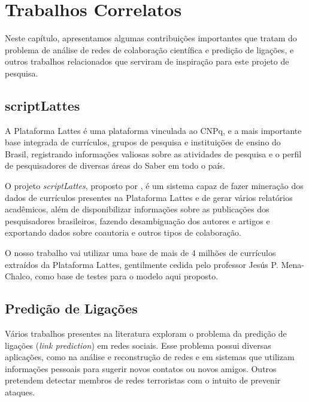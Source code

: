 \chapter{Trabalhos Correlatos}
\label{cap:correlatos}

Neste capítulo, apresentamos algumas contribuições importantes que tratam do problema de análise de redes de colaboração científica e predição de ligações, e outros trabalhos relacionados que serviram de inspiração para este projeto de pesquisa.


\section{scriptLattes}
\label{sec:scriptLattes}

A Plataforma Lattes é uma plataforma vinculada ao CNPq, e a mais importante base integrada de currículos, grupos de pesquisa e instituições de ensino do Brasil, registrando informações valiosas sobre as atividades de pesquisa e o perfil de pesquisadores de diversas áreas do Saber em todo o país.

O projeto \textit{scriptLattes}, proposto por \citet{Mena-Chalco2009}, é um sistema capaz de fazer mineração dos dados de currículos presentes na Plataforma Lattes e de gerar vários relatórios acadêmicos, além de disponibilizar informações sobre as publicações dos pesquisadores brasileiros, fazendo desambiguação dos autores e artigos e exportando dados sobre coautoria e outros tipos de colaboração.

O nosso trabalho vai utilizar uma base de mais de 4 milhões de currículos extraídos da Plataforma Lattes, gentilmente cedida pelo professor Jesús P. Mena-Chalco, como base de testes para o modelo aqui proposto.


\section{Predição de Ligações}
\label{sec:link-prediction}

Vários trabalhos presentes na literatura exploram o problema da predição de ligações (\textit{link prediction}) em redes sociais. Esse problema possui diversas aplicações, como na análise e reconstrução de redes e em sistemas que utilizam informações pessoais para sugerir novos contatos ou novos amigos. Outros pretendem detectar membros de redes terroristas com o intuito de prevenir ataques.

